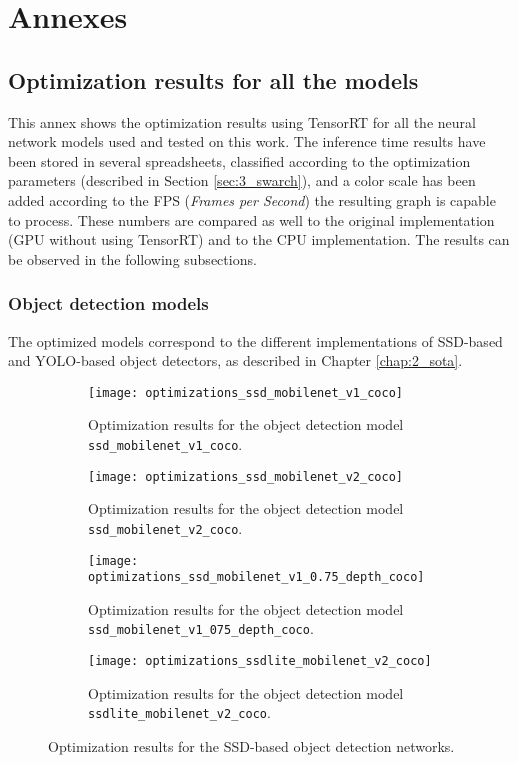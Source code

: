 \chapter{Annexes}
\label{chap:6_annexes}



\section{Optimization results for all the models}
\label{annex:opt_results}

This annex shows the optimization results using TensorRT for all the neural network models used and tested on this work. The inference time results have been stored in several spreadsheets, classified according to the optimization parameters (described in Section \ref{sec:3_swarch}), and a color scale has been added according to the FPS (\textit{Frames per Second}) the resulting graph is capable to process. These numbers are compared as well to the original implementation (GPU without using TensorRT) and to the CPU implementation. The results can be observed in the following subsections.

\subsection{Object detection models}

The optimized models correspond to the different implementations of SSD-based and YOLO-based object detectors, as described in Chapter \ref{chap:2_sota}.

\begin{figure}[h!]
	\centering
	\begin{subfigure}[h]{0.45\linewidth}
		\centering
		\texttt{[image: optimizations\_ssd\_mobilenet\_v1\_coco]}
		\caption{Optimization results for the object detection model \texttt{ssd\_mobilenet\_v1\_coco}.}
	\end{subfigure}
	\hfill
	\begin{subfigure}[h]{0.45\linewidth}
		\centering
		\texttt{[image: optimizations\_ssd\_mobilenet\_v2\_coco]}
		\caption{Optimization results for the object detection model \texttt{ssd\_mobilenet\_v2\_coco}.}
	\end{subfigure}
	\begin{subfigure}[h]{0.45\linewidth}
		\centering
		\texttt{[image: optimizations\_ssd\_mobilenet\_v1\_0.75\_depth\_coco]}
		\caption{Optimization results for the object detection model \texttt{ssd\_mobilenet\_v1\_0\.75\_depth\_coco}.}
	\end{subfigure}
	\hfill
	\begin{subfigure}[h]{0.45\linewidth}
		\centering
		\texttt{[image: optimizations\_ssdlite\_mobilenet\_v2\_coco]}
		\caption{Optimization results for the object detection model \texttt{ssdlite\_mobilenet\_v2\_coco}.}
	\end{subfigure}
	\caption{Optimization results for the SSD-based object detection networks.}
\end{figure}


